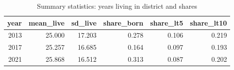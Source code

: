 \begin{table}[!h]
\centering
\caption{Summary statistics: years living in district and shares}
\centering
\begin{tabular}[t]{rrrrrr}
\toprule
year & mean\_live & sd\_live & share\_born & share\_lt5 & share\_lt10\\
\midrule
2013 & 25.000 & 17.203 & 0.278 & 0.106 & 0.219\\
2017 & 25.257 & 16.685 & 0.164 & 0.097 & 0.193\\
2021 & 25.868 & 16.512 & 0.313 & 0.087 & 0.202\\
\bottomrule
\end{tabular}
\end{table}

